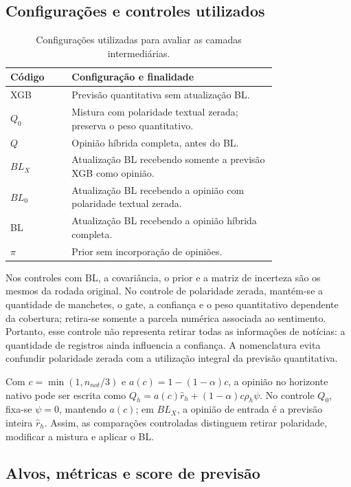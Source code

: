 \subsection{Configurações e controles utilizados}

\begin{table}[H]\centering
\caption{Configurações utilizadas para avaliar as camadas intermediárias.}
\label{tab:configuracoes_camadas}
{\footnotesize\setlength{\tabcolsep}{4pt}\begin{tabular}{lp{0.77\linewidth}}\hline
Código & Configuração e finalidade\\ \hline
XGB & Previsão quantitativa sem atualização BL.\\
$Q_0$ & Mistura com polaridade textual zerada; preserva o peso quantitativo.\\
$Q$ & Opinião híbrida completa, antes do BL.\\
$BL_X$ & Atualização BL recebendo somente a previsão XGB como opinião.\\
$BL_0$ & Atualização BL recebendo a opinião com polaridade textual zerada.\\
BL & Atualização BL recebendo a opinião híbrida completa.\\
$\pi$ & Prior sem incorporação de opiniões.\\
\hline\end{tabular}}
\par{}
\end{table}

Nos controles com BL, a covariância, o prior e a matriz de incerteza são os mesmos da rodada original. No controle de polaridade zerada, mantém-se a quantidade de manchetes, o gate, a confiança e o peso quantitativo dependente da cobertura; retira-se somente a parcela numérica associada ao sentimento. Portanto, esse controle não representa retirar todas as informações de notícias: a quantidade de registros ainda influencia a confiança. A nomenclatura evita confundir polaridade zerada com a utilização integral da previsão quantitativa.

Com $c=\min(1,n_{not}/3)$ e $a(c)=1-(1-\alpha)c$, a opinião no horizonte nativo pode ser escrita como $Q_h=a(c)\widehat r_h+(1-\alpha)c\rho_h\psi$. No controle $Q_0$, fixa-se $\psi=0$, mantendo $a(c)$; em $BL_X$, a opinião de entrada é a previsão inteira $\widehat r_h$. Assim, as comparações controladas distinguem retirar polaridade, modificar a mistura e aplicar o BL.

\subsection{Alvos, métricas e score de previsão}

